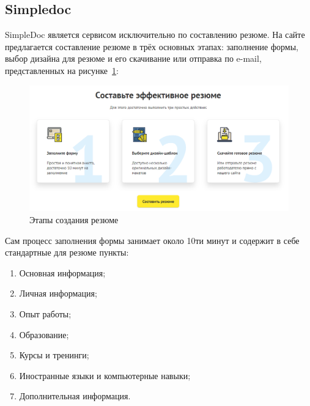 \documentclass[master, och, pract]{SCWorks}
\begin{document}
\subsection{Simpledoc}
SimpleDoc является сервисом исключительно по составлению резюме. На сайте предлагается 
составление резюме в трёх основных этапах: заполнение формы, выбор дизайна для резюме 
и его скачивание или отправка по e-mail, представленных на рисунке~\ref{fig:16}:
\begin{figure}[!ht]
    \centering
    \includegraphics[width=12cm]{images/image5.png}
    \caption{\label{fig:16}%
        Этапы создания резюме}
\end{figure}

Сам процесс заполнения формы занимает около 10ти минут и содержит в себе стандартные 
для резюме пункты:
\begin{enumerate}
    \item Основная информация;
    \item Личная информация;
    \item Опыт работы;
    \item Образование;
    \item Курсы и тренинги;
    \item Иностранные языки и компьютерные навыки;
    \item Дополнительная информация.
\end{enumerate}
\end{document}
